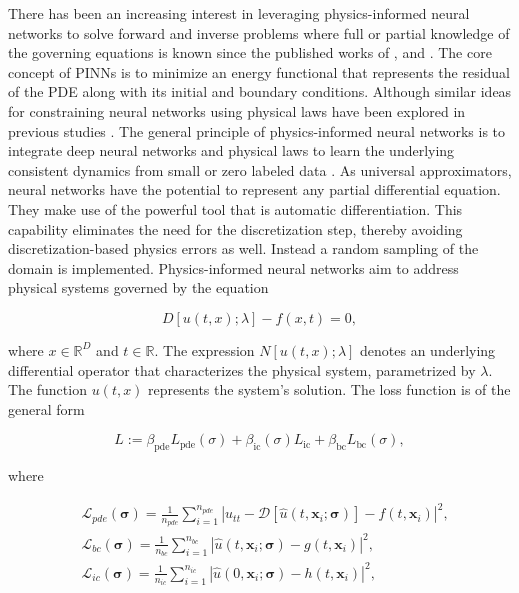 \documentclass[11pt,twoside]{article}
\begin{document}
There has been an increasing interest in leveraging physics-informed neural networks to solve forward and 
inverse problems where full or partial knowledge of the governing equations is known since the published 
works of ,  and 
. The core concept of PINNs is to minimize an energy functional that represents 
the residual of the PDE along with its initial and boundary conditions. Although similar ideas for constraining 
neural networks using physical laws have been explored in previous studies \citep{lagaris_artificial_1998}. 
The general principle of physics-informed neural networks is to integrate deep neural networks and physical 
laws to learn the underlying consistent dynamics from small or zero labeled data \citep{karniadakis_physics-informed_2021}. 
As universal approximators, neural networks have the potential to represent any partial differential 
equation. They make use of the powerful tool that is automatic differentiation. This capability eliminates 
the need for the discretization step, thereby avoiding discretization-based physics errors as well. 
Instead a random sampling of the domain is implemented. Physics-informed neural networks aim to address 
physical systems governed by the equation

$$
D[u(t, x); \lambda] - f(x,t) = 0,
$$

where \(x \in \mathbb{R}^D\) and \(t \in \mathbb{R}\). The expression \(N[u(t, x); \lambda]\) denotes 
an underlying differential operator that characterizes the physical system, parametrized by \(\lambda\). 
The function \(u(t, x)\) represents the system's solution. The loss function is of the general form 

$$ L := \beta_{\text{pde}}L_{\text{pde}}(\sigma) + \beta_{\text{ic}}(\sigma) L_{\text{ic}} + 
\beta_{\text{bc}} L_{\text{bc}}(\sigma) ,$$

where

$$
\begin{aligned}
& \mathcal{L}_{pde}(\boldsymbol{\sigma})=\frac{1}{n_{pde}} \sum_{i=1}^{n_{pde}}\left|u_{tt} - 
\mathcal{D}\left[\hat{u}\left(t,\boldsymbol{x}_i ; \boldsymbol{\sigma}\right)\right]-f\left(t, \boldsymbol{x}_i\right)\right|^2, \\
& \mathcal{L}_{bc}(\boldsymbol{\sigma})=\frac{1}{n_{bc}} \sum_{i=1}^{n_{bc}}\left|\hat{u}\left(t, \boldsymbol{x}_i ;
 \boldsymbol{\sigma}\right)-g\left(t, \boldsymbol{x}_i\right)\right|^2, \\
& \mathcal{L}_{ic}(\boldsymbol{\sigma})=\frac{1}{n_{ic}} \sum_{i=1}^{n_{ic}}\left|\hat{u}\left(0, \boldsymbol{x}_i ;
 \boldsymbol{\sigma}\right)-h\left(t,\boldsymbol{x}_i\right)\right|^2,
\end{aligned}
$$
\end{document}

